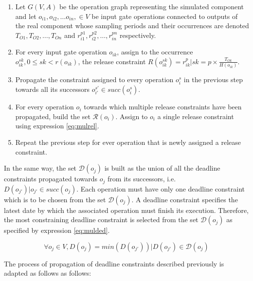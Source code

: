 \begin{enumerate}
\item Let $G(V,A)$ be the operation graph representing the simulated component and let $o_{i1}, o_{i2}, \ldots o_{in},\in  V$ be input gate operations connected to outputs of the real component whose sampling periods and their occurrences are denoted $T_{O1}, T_{O2}, \ldots, T_{On}$ and $r_{i1}^{p1}, r_{i2}^{p2}, \ldots, r_{in}^{pn}$ respectively.
\item For every input gate operation $o_{ik}$, assign to the occurrence $o_{ik}^{sk}, 0 \leq sk < r(o_{ik})$, the release constraint $R(o_{ik}^{sk}) = r_{ik}^p | sk = p \times \frac{T_{Ok}}{H(o_{ik})}$.
\item Propagate the constraint assigned to every operation $o_i^s$ in the previous step towards all its successors $o_{i'}^{s'} \in succ(o_i^s)$.
\item For every operation $o_i$ towards which multiple release constraints have been propagated, build the set $\mathcal{R}(o_i)$. Assign to $o_i$ a single release constraint using expression \ref{eq:mulrel}.
\item Repeat the previous step for ever operation that is newly assigned a release constraint.
\end{enumerate}

In the same way, the set $\mathcal{D}(o_j)$ is built as the union of all the deadline constraints propagated towards $o_j$ from its successors, i.e. $D(o_{j'}) | o_{j'} \in succ(o_j)$. Each operation must have only one deadline constraint which is to be chosen from the set $\mathcal{D}(o_j)$. A deadline constraint specifies the latest date by which the associated operation must finish its execution. Therefore, the most constraining deadline constraint is selected from the set $\mathcal{D}(o_j)$ as specified by expression \ref{eq:mulded}.

\begin{equation}
\forall o_j \in V, D(o_j) = min(D(o_{j'})) | D(o_{j'}) \in \mathcal{D}(o_j) 
\label{eq:mulded}
\end{equation}

The process of propagation of deadline constraints described previously is adapted as follows as follows:


